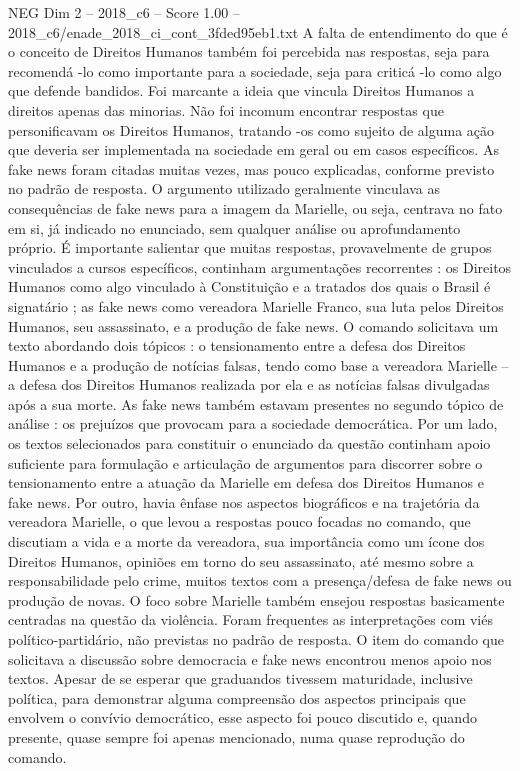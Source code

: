 \begin{textsample}{NEG Dim 2 – 2018\_c6 – Score 1.00 – 2018\_c6/enade\_2018\_ci\_cont\_3fded95eb1.txt}
A falta de entendimento do que é o conceito de Direitos Humanos também foi percebida nas respostas, seja para recomendá -lo como importante para a sociedade, seja para criticá -lo como algo que defende bandidos.
Foi marcante a ideia que vincula Direitos Humanos a direitos apenas das minorias.
Não foi incomum encontrar respostas que personificavam os Direitos Humanos, tratando -os como sujeito de alguma ação que deveria ser implementada na sociedade em geral ou em casos específicos.
As fake news foram citadas muitas vezes, mas pouco explicadas, conforme previsto no padrão de resposta.
O argumento utilizado geralmente vinculava as consequências de fake news para a imagem da Marielle, ou seja, centrava no fato em si, já indicado no enunciado, sem qualquer análise ou aprofundamento próprio.
É importante salientar que muitas respostas, provavelmente de grupos vinculados a cursos específicos, continham argumentações recorrentes : os Direitos Humanos como algo vinculado à Constituição e a tratados dos quais o Brasil é signatário ; as fake news como vereadora Marielle Franco, sua luta pelos Direitos Humanos, seu assassinato, e a produção de fake news.
O comando solicitava um texto abordando dois tópicos : o tensionamento entre a defesa dos Direitos Humanos e a produção de notícias falsas, tendo como base a vereadora Marielle – a defesa dos Direitos Humanos realizada por ela e as notícias falsas divulgadas após a sua morte.
As fake news também estavam presentes no segundo tópico de análise : os prejuízos que provocam para a sociedade democrática.
Por um lado, os textos selecionados para constituir o enunciado da questão continham apoio suficiente para formulação e articulação de argumentos para discorrer sobre o tensionamento entre a atuação da Marielle em defesa dos Direitos Humanos e fake news.
Por outro, havia ênfase nos aspectos biográficos e na trajetória da vereadora Marielle, o que levou a respostas pouco focadas no comando, que discutiam a vida e a morte da vereadora, sua importância como um ícone dos Direitos Humanos, opiniões em torno do seu assassinato, até mesmo sobre a responsabilidade pelo crime, muitos textos com a presença/defesa de fake news ou produção de novas.
O foco sobre Marielle também ensejou respostas basicamente centradas na questão da violência.
Foram frequentes as interpretações com viés político-partidário, não previstas no padrão de resposta.
O item do comando que solicitava a discussão sobre democracia e fake news encontrou menos apoio nos textos.
Apesar de se esperar que graduandos tivessem maturidade, inclusive política, para demonstrar alguma compreensão dos aspectos principais que envolvem o convívio democrático, esse aspecto foi pouco discutido e, quando presente, quase sempre foi apenas mencionado, numa quase reprodução do comando.

\end{textsample}
